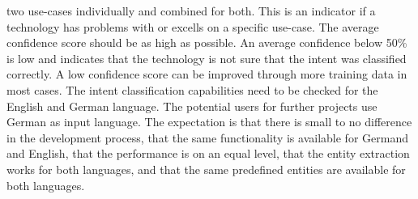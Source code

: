 two use-cases individually and combined for both.
This is an indicator if a technology has problems with or excells
on a specific use-case.
The average confidence score should be as high as possible.
An average confidence below 50\% is low and indicates 
that the technology is not sure that the intent was 
classified correctly.
A low confidence score can be improved through more training data
in most cases. 
The intent classification capabilities need to be checked for the English and German 
language.
The potential users for further projects use German as input language.
The expectation is that there is small to no difference in the development process, 
that the same functionality is available for Germand and English,
that the performance is on an equal level, that the 
entity extraction works for both languages, and that 
the same predefined entities are available for both languages.

